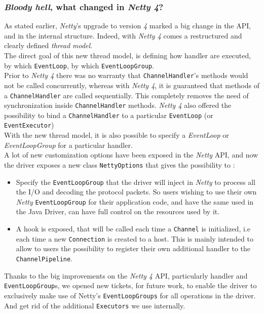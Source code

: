 \documentclass[a4paper]{report}
\begin{document}
\subsubsection{\emph{Bloody hell}, what changed in \emph{Netty 4}?}
As stated earlier, \emph{Netty}'s upgrade to version \emph{4} marked a big change in the API, and in the internal structure. Indeed, with \emph{Netty 4} comes a restructured and clearly defined \emph{thread model}.\\
The direct goal of this new thread model, is defining how handler are executed, by which \verb;EventLoop;, by which \verb;EventLoopGroup;. \\
Prior to \emph{Netty 4} there was no warranty that \verb;ChannelHandler;'s methods would not be called concurrently, whereas with \emph{Netty 4}, it is guaranteed that methods of a \verb;ChannelHandler; are called sequentially. This completely removes the need of synchronization inside \verb;ChannelHandler; methods. \emph{Netty 4} also offered the possibility to bind a \verb;ChannelHandler; to a particular \verb;EventLoop; (or \verb;EventExecutor;)\\
With the new thread model, it is also possible to specify a \emph{EventLoop} or \emph{EventLoopGroup} for a particular handler.\\
A lot of new customization options have been exposed in the \emph{Netty} API, and now the driver exposes a new class \verb;NettyOptions; that gives the possibility to : 
\begin{itemize}
   \item Specify the \verb;EventLoopGroup; that the driver will inject in \emph{Netty} to process all the I/O and decoding the protocol packets. So users wishing to use their own \emph{Netty} \verb;EventLoopGroup; for their application code, and have the same used in the Java Driver, can have full control on the resources used by it.
   \item A hook is exposed, that will be called each time a \verb;Channel; is initialized, i.e each time a new \verb;Connection; is created to a host. This is mainly intended to allow to users the possibility to register their own additional handler to the \verb;ChannelPipeline;.
\end{itemize}
Thanks to the big improvements on the \emph{Netty 4} API, particularly handler and \verb;EventLoopGroup;s, we opened new tickets, for future work, to enable the driver to exclusively make use of Netty's \verb;EventLoopGroups; for all operations in the driver. And get rid of the additional \verb;Executors; we use internally.
\end{document}
